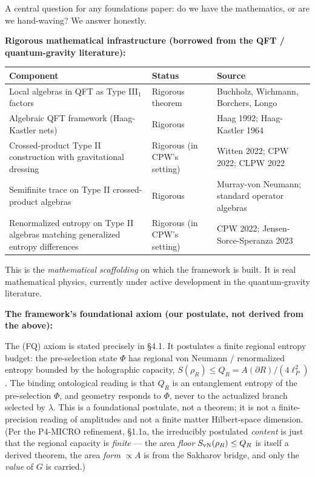 \documentclass[11pt,a4paper]{article}
\begin{document}
A central question for any foundations paper: do we have the mathematics, or are we hand-waving? We answer honestly.

\textbf{Rigorous mathematical infrastructure (borrowed from the QFT / quantum-gravity literature):}

\begin{center}
\small
\begin{tabularx}{\linewidth}{|Y|Y|Y|}
\hline
\textbf{Component} & \textbf{Status} & \textbf{Source} \\
\hline
Local algebras in QFT as Type III$_1$ factors & Rigorous theorem & Buchholz, Wichmann, Borchers, Longo \\
\hline
Algebraic QFT framework (Haag-Kastler nets) & Rigorous & Haag 1992; Haag-Kastler 1964 \\
\hline
Crossed-product Type II construction with gravitational dressing & Rigorous (in CPW's setting) & Witten 2022; CPW 2022; CLPW 2022 \\
\hline
Semifinite trace on Type II crossed-product algebras & Rigorous & Murray-von Neumann; standard operator algebras \\
\hline
Renormalized entropy on Type II algebras matching generalized entropy differences & Rigorous (in CPW's setting) & CPW 2022; Jensen-Sorce-Speranza 2023 \\
\hline
\end{tabularx}
\end{center}

This is the \emph{mathematical scaffolding} on which the framework is built. It is real mathematical physics, currently under active development in the quantum-gravity literature.

\textbf{The framework's foundational axiom (our postulate, not derived from the above):}

The (FQ) axiom is stated precisely in §4.1. It postulates a finite regional entropy budget: the pre-selection state $\Phi$ has regional von Neumann / renormalized entropy bounded by the holographic capacity, $S(\rho_R) \le Q_R = A(\partial R)/(4\ell_P^2)$. The binding ontological reading is that $Q_R$ is an entanglement entropy of the pre-selection $\Phi$, and geometry responds to $\Phi$, never to the actualized branch selected by $\lambda$. This is a foundational postulate, not a theorem; it is not a finite-precision reading of amplitudes and not a finite matter Hilbert-space dimension. (Per the P4-MICRO refinement, §1.1a, the irreducibly postulated \emph{content} is just that the regional capacity is \emph{finite} — the area \emph{floor} $S_{\rm vN}(\rho_R)\le Q_R$ is itself a derived theorem, the area \emph{form} $\propto A$ is from the Sakharov bridge, and only the \emph{value} of $G$ is carried.)
\end{document}

